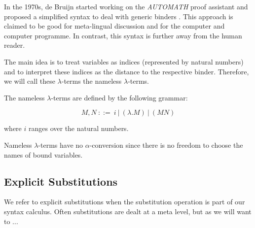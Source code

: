 \cite{deBruijn} \cite{AutosubstSchafer}

In the 1970s, de Bruijn started working on the \textit{AUTOMATH} proof assistant and proposed a simplified syntax to deal with generic binders \cite{deBruijn}.
This approach is claimed to be good for meta-lingual discussion and for the computer and computer programme. In contrast, this syntax is further away from the human reader.

The main idea is to treat variables as indices (represented by natural numbers) and to interpret these indices as the distance to the respective binder.
Therefore, we will call these $\lambda$-terms the nameless $\lambda$-terms.

\begin{definition}
  The nameless $\lambda$-terms are defined by the following grammar:

  \[ M, N \ ::= \ i \ | \ (\lambda . M) \ | \ (M N) \]

  where $i$ ranges over the natural numbers.
\end{definition}

\begin{remark}
	Nameless $\lambda$-terms have no $\alpha$-conversion since there is no freedom to choose the names of bound variables.
\end{remark}

\subsection{Explicit Substitutions}

We refer to explicit substitutions when the substitution operation is part of our syntax calculus. Often substitutions are dealt at a meta level, but as we will want to ...

